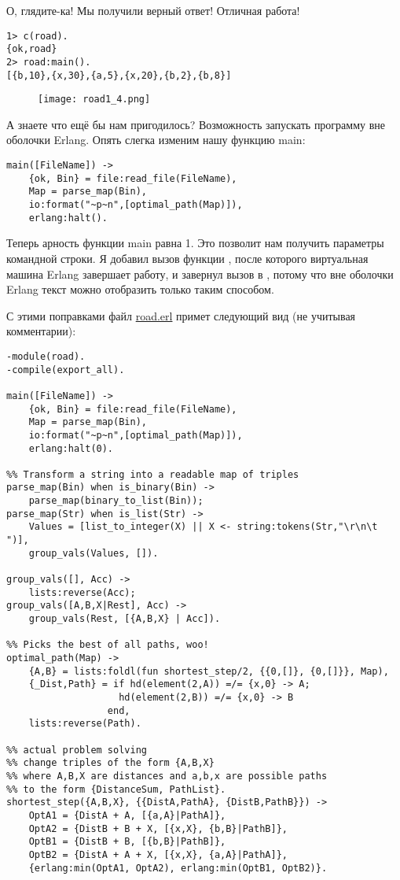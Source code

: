 О, глядите\--ка!
Мы получили верный ответ!
Отличная работа!
\begin{lstlisting}[style=erlang]
1> c(road).
{ok,road}
2> road:main().
[{b,10},{x,30},{a,5},{x,20},{b,2},{b,8}]
\end{lstlisting}

\begin{figure}[h!]
    \centering
    \texttt{[image: road1\_4.png]}
\end{figure}

А знаете что ещё бы нам пригодилось?
Возможность запускать программу вне оболочки Erlang.
Опять слегка изменим нашу функцию main:
\begin{lstlisting}[style=erlang]
main([FileName]) ->
    {ok, Bin} = file:read_file(FileName),
    Map = parse_map(Bin),
    io:format("~p~n",[optimal_path(Map)]),
    erlang:halt().
\end{lstlisting}

Теперь арность функции main равна 1.
Это позволит нам получить параметры командной строки.
Я добавил вызов функции , после которого виртуальная машина Erlang завершает работу, и завернул вызов  в , потому что вне оболочки Erlang текст можно отобразить только таким способом.

С этими поправками файл \href{http://learnyousomeerlang.com/static/erlang/road.erl}{road.erl} примет следующий вид (не учитывая комментарии):
\begin{lstlisting}[style=erlang]
-module(road).
-compile(export_all).
 
main([FileName]) ->
    {ok, Bin} = file:read_file(FileName),
    Map = parse_map(Bin),
    io:format("~p~n",[optimal_path(Map)]),
    erlang:halt(0).
 
%% Transform a string into a readable map of triples
parse_map(Bin) when is_binary(Bin) ->
    parse_map(binary_to_list(Bin));
parse_map(Str) when is_list(Str) ->
    Values = [list_to_integer(X) || X <- string:tokens(Str,"\r\n\t ")],
    group_vals(Values, []).
 
group_vals([], Acc) ->
    lists:reverse(Acc);
group_vals([A,B,X|Rest], Acc) ->
    group_vals(Rest, [{A,B,X} | Acc]).
 
%% Picks the best of all paths, woo!
optimal_path(Map) ->
    {A,B} = lists:foldl(fun shortest_step/2, {{0,[]}, {0,[]}}, Map),
    {_Dist,Path} = if hd(element(2,A)) =/= {x,0} -> A;
                    hd(element(2,B)) =/= {x,0} -> B
                  end,
    lists:reverse(Path).
 
%% actual problem solving
%% change triples of the form {A,B,X}
%% where A,B,X are distances and a,b,x are possible paths
%% to the form {DistanceSum, PathList}.
shortest_step({A,B,X}, {{DistA,PathA}, {DistB,PathB}}) ->
    OptA1 = {DistA + A, [{a,A}|PathA]},
    OptA2 = {DistB + B + X, [{x,X}, {b,B}|PathB]},
    OptB1 = {DistB + B, [{b,B}|PathB]},
    OptB2 = {DistA + A + X, [{x,X}, {a,A}|PathA]},
    {erlang:min(OptA1, OptA2), erlang:min(OptB1, OptB2)}.
\end{lstlisting}

